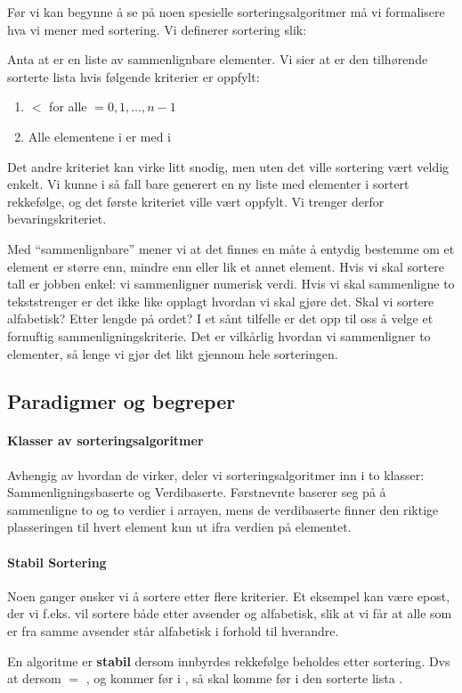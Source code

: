 \label{sort_form}
Før vi kan begynne å se på noen spesielle sorteringsalgoritmer må vi formalisere hva vi mener med sortering. Vi definerer sortering slik:

\begin{definition}
Anta at  er en liste av sammenlignbare elementer. Vi sier at  er den tilhørende sorterte lista hvis følgende kriterier er oppfylt:
\begin{enumerate}[i]
\item {} $ < $  for alle  $ = 0, 1, \ldots, n-1 $
\item Alle elementene i  er med i 
\end{enumerate}
\end{definition}

Det andre kriteriet kan virke litt snodig, men uten det ville sortering vært veldig enkelt. Vi kunne i så fall bare generert en ny liste med elementer i sortert rekkefølge, og det første kriteriet ville vært oppfylt. Vi trenger derfor bevaringskriteriet. 

Med ``sammenlignbare'' mener vi at det finnes en måte å entydig bestemme om et element er større enn, mindre enn eller lik et annet element. Hvis vi skal sortere tall er jobben enkel: vi sammenligner numerisk verdi. Hvis vi skal sammenligne to tekststrenger er det ikke like opplagt hvordan vi skal gjøre det. Skal vi sortere alfabetisk? Etter lengde på ordet? I et sånt tilfelle er det opp til oss å velge et fornuftig sammenligningskriterie. Det er vilkårlig hvordan vi sammenligner to elementer, så lenge vi gjør det likt gjennom hele sorteringen. 

\subsection*{Paradigmer og begreper}
\label{sec:sortbegrep}

\paragraph{Klasser av sorteringsalgoritmer}
Avhengig av hvordan de virker, deler vi sorteringsalgoritmer inn i to klasser:
Sammenligningsbaserte og Verdibaserte. Førstnevnte baserer seg på å sammenligne
to og to verdier i arrayen, mens de verdibaserte finner den riktige plasseringen
til hvert element kun ut ifra verdien på elementet. 


\paragraph{Stabil Sortering}\label{stabil}
Noen ganger ønsker vi å sortere etter flere kriterier. Et eksempel kan være
epost, der vi f.eks. vil sortere både etter avsender og alfabetisk, slik at vi
får at alle som er fra samme avsender står alfabetisk i forhold til hverandre.
\newpage
\begin{definition}
  En algoritme er \textbf{stabil} dersom innbyrdes rekkefølge beholdes
  etter sortering. Dvs at dersom  $ = $ , og  kommer før  i , så skal  komme før  i den sorterte lista .
\end{definition}

